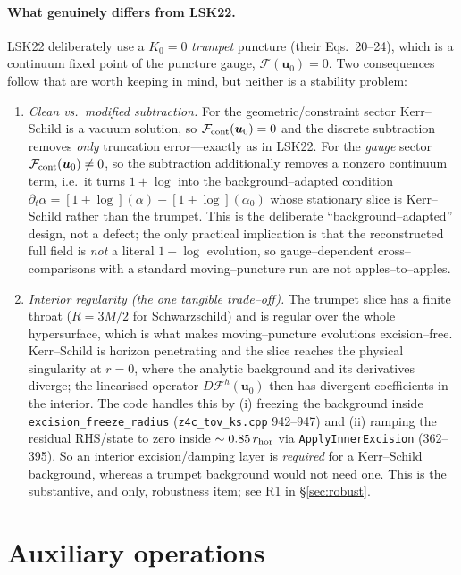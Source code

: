 \documentclass[11pt]{article}
\newcommand{\code}[1]{\texttt{#1}}
\newcommand{\file}[1]{\texttt{#1}}
\newcommand{\bg}[1]{#1_{0}}
\newcommand{\Fop}{\mathcal{F}}            %
\newcommand{\Fnum}{\Fop^{h}}              %
\begin{document}
\paragraph{What genuinely differs from LSK22.} LSK22 deliberately use a $K_0=0$
\emph{trumpet} puncture (their Eqs.~20--24), which is a continuum fixed point of
the puncture gauge, $\Fop(\bg{\bm u})=0$. Two consequences follow that are
worth keeping in mind, but neither is a stability problem:
\begin{enumerate}[leftmargin=1.6em,itemsep=2pt]
\item \emph{Clean vs.\ modified subtraction.} For the geometric/constraint
sector Kerr--Schild is a vacuum solution, so $\Fop_{\rm cont}(\bg{\bm u})=0$ and
the discrete subtraction removes \emph{only} truncation error---exactly as in
LSK22. For the \emph{gauge} sector $\Fop_{\rm cont}(\bg{\bm u})\neq0$, so the
subtraction additionally removes a nonzero continuum term, i.e.\ it turns
$1+\log$ into the background--adapted condition
$\partial_t\alpha=[1{+}\log](\alpha)-[1{+}\log](\bg\alpha)$ whose stationary
slice is Kerr--Schild rather than the trumpet. This is the deliberate
``background--adapted'' design, not a defect; the only practical implication is
that the reconstructed full field is \emph{not} a literal $1+\log$ evolution, so
gauge--dependent cross--comparisons with a standard moving--puncture run are not
apples--to--apples.
\item \emph{Interior regularity (the one tangible trade--off).} The trumpet
slice has a finite throat ($R=3M/2$ for Schwarzschild) and is regular over the
whole hypersurface, which is what makes moving--puncture evolutions
excision--free. Kerr--Schild is horizon penetrating and the slice reaches the
physical singularity at $r=0$, where the analytic background and its derivatives
diverge; the linearised operator $D\Fnum(\bg{\bm u})$ then has divergent
coefficients in the interior. The code handles this by (i) freezing the
background inside \code{excision\_freeze\_radius} (\file{z4c\_tov\_ks.cpp}
942--947) and (ii) ramping the residual RHS/state to zero inside
$\sim0.85\,r_{\rm hor}$ via \code{ApplyInnerExcision} (362--395). So an interior
excision/damping layer is \emph{required} for a Kerr--Schild background, whereas
a trumpet background would not need one. This is the substantive, and only,
robustness item; see R1 in \S\ref{sec:robust}.
\end{enumerate}

\section{Auxiliary operations}
\end{document}
